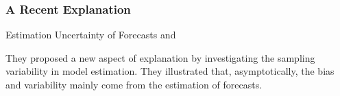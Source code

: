 \begin{frame}
\frametitle{A Recent Explanation}

    \begin{alertblock}{\Large{Estimation Uncertainty of Forecasts}}
    \cite{ZMFP22} and \cite{FZMP23}
    \end{alertblock}

    \vspace{5mm}
    
    They proposed a new aspect of explanation by investigating the sampling variability in model estimation. They illustrated that, asymptotically, the bias and variability mainly come from the estimation of forecasts.

\end{frame}





